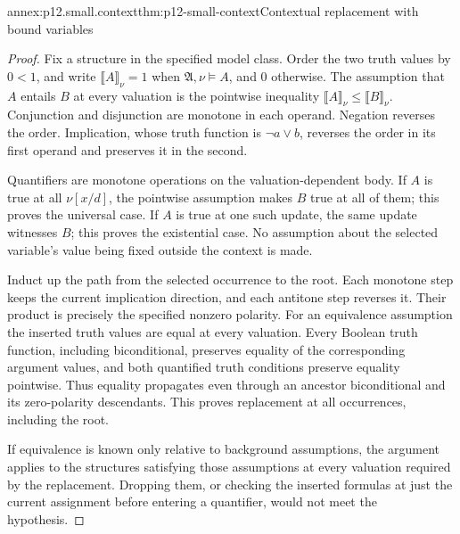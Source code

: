 \begin{annexitem}{annex:p12.small.context}{thm:p12-small-context}{Contextual replacement with bound variables}
\begin{proof}
Fix a structure in the specified model class. Order the two truth
values by \(0<1\), and write \(\llbracket A\rrbracket_\nu=1\)
when \(\mathfrak A,\nu\models A\), and \(0\) otherwise.
The assumption that \(A\) entails \(B\)
at every valuation is the pointwise inequality
\(\llbracket A\rrbracket_\nu\le
\llbracket B\rrbracket_\nu\). Conjunction and disjunction are
monotone in each operand. Negation reverses the order. Implication,
whose truth function is \(\neg a\lor b\), reverses the order in
its first operand and preserves it in the second.

Quantifiers are monotone operations on the valuation-dependent body.
If \(A\) is true at all \(\nu[x/d]\), the pointwise assumption
makes \(B\) true at all of them; this proves the universal case.
If \(A\) is true at one such update, the same update witnesses
\(B\); this proves the existential case. No assumption about the
selected variable's value being fixed outside the context is made.

Induct up the path from the selected occurrence to the root.
Each monotone step keeps the current implication direction, and
each antitone step reverses it. Their product is precisely the
specified nonzero polarity. For an equivalence assumption the
inserted truth values are equal at every valuation. Every Boolean
truth function, including biconditional, preserves equality of the
corresponding argument values, and both quantified truth conditions
preserve equality pointwise. Thus equality propagates even through
an ancestor biconditional and its zero-polarity descendants.
This proves replacement at all occurrences, including the root.

If equivalence is known only relative to background assumptions,
the argument applies to the structures satisfying those assumptions
at every valuation required by the replacement. Dropping them, or
checking the inserted formulas at just the current assignment before
entering a quantifier, would not meet the hypothesis.
\end{proof}
\end{annexitem}

